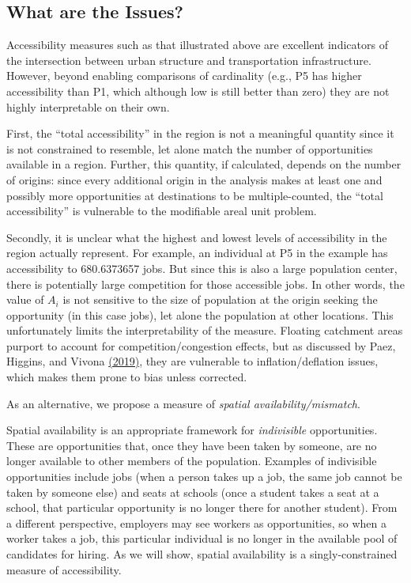 \documentclass[]{elsarticle} %
\begin{document}
\hypertarget{what-are-the-issues}{%
\subsection{What are the Issues?}\label{what-are-the-issues}}

Accessibility measures such as that illustrated above are excellent
indicators of the intersection between urban structure and
transportation infrastructure. However, beyond enabling comparisons of
cardinality (e.g., P5 has higher accessibility than P1, which although
low is still better than zero) they are not highly interpretable on
their own.

First, the ``total accessibility'' in the region is not a meaningful
quantity since it is not constrained to resemble, let alone match the
number of opportunities available in a region. Further, this quantity,
if calculated, depends on the number of origins: since every additional
origin in the analysis makes at least one and possibly more
opportunities at destinations to be multiple-counted, the ``total
accessibility'' is vulnerable to the modifiable areal unit problem.

Secondly, it is unclear what the highest and lowest levels of
accessibility in the region actually represent. For example, an
individual at P5 in the example has accessibility to 680.6373657 jobs.
But since this is also a large population center, there is potentially
large competition for those accessible jobs. In other words, the value
of \(A_i\) is not sensitive to the size of population at the origin
seeking the opportunity (in this case jobs), let alone the population at
other locations. This unfortunately limits the interpretability of the
measure. Floating catchment areas purport to account for
competition/congestion effects, but as discussed by Paez, Higgins, and
Vivona \href{https://doi.org/10.1371/journal.pone.0218773}{(2019)}, they
are vulnerable to inflation/deflation issues, which makes them prone to
bias unless corrected.

As an alternative, we propose a measure of \emph{spatial
availability/mismatch}.

Spatial availability is an appropriate framework for \emph{indivisible}
opportunities. These are opportunities that, once they have been taken
by someone, are no longer available to other members of the population.
Examples of indivisible opportunities include jobs (when a person takes
up a job, the same job cannot be taken by someone else) and seats at
schools (once a student takes a seat at a school, that particular
opportunity is no longer there for another student). From a different
perspective, employers may see workers as opportunities, so when a
worker takes a job, this particular individual is no longer in the
available pool of candidates for hiring. As we will show, spatial
availability is a singly-constrained measure of accessibility.
\end{document}
